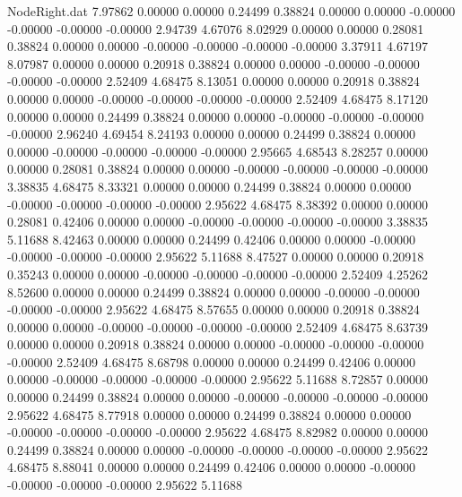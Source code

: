 \begin{filecontents}{NodeRight.dat}
   7.97862    0.00000    0.00000     0.24499    0.38824    0.00000    0.00000   -0.00000   -0.00000   -0.00000   -0.00000    2.94739    4.67076
   8.02929    0.00000    0.00000     0.28081    0.38824    0.00000    0.00000   -0.00000   -0.00000   -0.00000   -0.00000    3.37911    4.67197
   8.07987    0.00000    0.00000     0.20918    0.38824    0.00000    0.00000   -0.00000   -0.00000   -0.00000   -0.00000    2.52409    4.68475
   8.13051    0.00000    0.00000     0.20918    0.38824    0.00000    0.00000   -0.00000   -0.00000   -0.00000   -0.00000    2.52409    4.68475
   8.17120    0.00000    0.00000     0.24499    0.38824    0.00000    0.00000   -0.00000   -0.00000   -0.00000   -0.00000    2.96240    4.69454
   8.24193    0.00000    0.00000     0.24499    0.38824    0.00000    0.00000   -0.00000   -0.00000   -0.00000   -0.00000    2.95665    4.68543
   8.28257    0.00000    0.00000     0.28081    0.38824    0.00000    0.00000   -0.00000   -0.00000   -0.00000   -0.00000    3.38835    4.68475
   8.33321    0.00000    0.00000     0.24499    0.38824    0.00000    0.00000   -0.00000   -0.00000   -0.00000   -0.00000    2.95622    4.68475
   8.38392    0.00000    0.00000     0.28081    0.42406    0.00000    0.00000   -0.00000   -0.00000   -0.00000   -0.00000    3.38835    5.11688
   8.42463    0.00000    0.00000     0.24499    0.42406    0.00000    0.00000   -0.00000   -0.00000   -0.00000   -0.00000    2.95622    5.11688
   8.47527    0.00000    0.00000     0.20918    0.35243    0.00000    0.00000   -0.00000   -0.00000   -0.00000   -0.00000    2.52409    4.25262
   8.52600    0.00000    0.00000     0.24499    0.38824    0.00000    0.00000   -0.00000   -0.00000   -0.00000   -0.00000    2.95622    4.68475
   8.57655    0.00000    0.00000     0.20918    0.38824    0.00000    0.00000   -0.00000   -0.00000   -0.00000   -0.00000    2.52409    4.68475
   8.63739    0.00000    0.00000     0.20918    0.38824    0.00000    0.00000   -0.00000   -0.00000   -0.00000   -0.00000    2.52409    4.68475
   8.68798    0.00000    0.00000     0.24499    0.42406    0.00000    0.00000   -0.00000   -0.00000   -0.00000   -0.00000    2.95622    5.11688
   8.72857    0.00000    0.00000     0.24499    0.38824    0.00000    0.00000   -0.00000   -0.00000   -0.00000   -0.00000    2.95622    4.68475
   8.77918    0.00000    0.00000     0.24499    0.38824    0.00000    0.00000   -0.00000   -0.00000   -0.00000   -0.00000    2.95622    4.68475
   8.82982    0.00000    0.00000     0.24499    0.38824    0.00000    0.00000   -0.00000   -0.00000   -0.00000   -0.00000    2.95622    4.68475
   8.88041    0.00000    0.00000     0.24499    0.42406    0.00000    0.00000   -0.00000   -0.00000   -0.00000   -0.00000    2.95622    5.11688

\end{filecontents}
